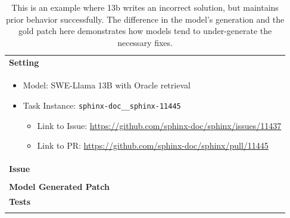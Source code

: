 \begin{table}[ht]
\caption{
This is an example where \swellama 13b writes an incorrect solution, but maintains prior behavior successfully.
The difference in the model's generation and the gold patch here demonstrates how models tend to under-generate the necessary fixes.
}
\label{table:appx:quality-example4}
\centering
\begin{tabular}{p{\linewidth}}
    \toprule
    \textbf{Setting} \\
    \begin{itemize}[noitemsep,topsep=0pt]
        \item Model: SWE-Llama 13B with Oracle retrieval
        \item Task Instance: \texttt{sphinx-doc\_\_sphinx-11445}
        \begin{itemize}
            \item Link to Issue: \href{https://github.com/sphinx-doc/sphinx/issues/11437}{https://github.com/sphinx-doc/sphinx/issues/11437}
            \item Link to PR: \href{https://github.com/sphinx-doc/sphinx/pull/11445}{https://github.com/sphinx-doc/sphinx/pull/11445}
        \end{itemize}
    \end{itemize} \\
    \midrule
    \textbf{Issue} \\
     \\
    \midrule
    \textbf{Model Generated Patch}
     \\
    \midrule
    \textbf{Tests} \\
     \\
    \bottomrule
\end{tabular}
\end{table}
